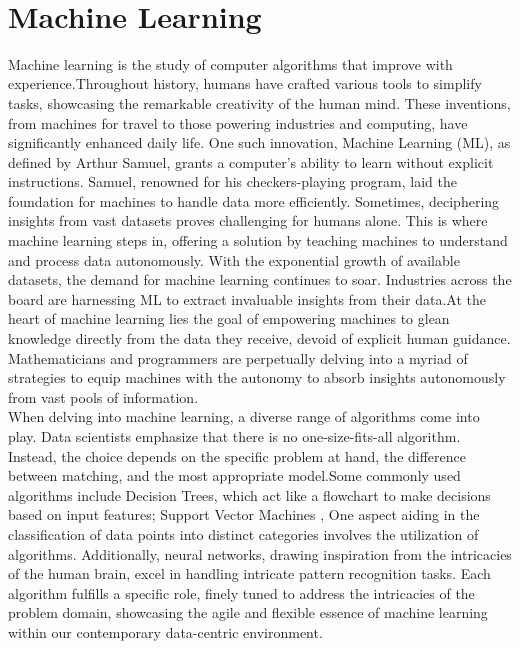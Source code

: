 \\

\section{Machine Learning }
Machine learning is the study of computer algorithms that improve with experience.Throughout history, humans have crafted various tools to simplify tasks, showcasing the remarkable creativity of the human mind. These inventions, from machines for travel to those powering industries and computing, have significantly enhanced daily life. One such innovation, Machine Learning (ML), as defined by Arthur Samuel, grants a computer's ability to learn without explicit instructions. Samuel, renowned for his checkers-playing program, laid the foundation for machines to handle data more efficiently. Sometimes, deciphering insights from vast datasets proves challenging for humans alone. This is where machine learning steps in, offering a solution by teaching machines to understand and process data autonomously. With the exponential growth of available datasets, the demand for machine learning continues to soar. Industries across the board are harnessing ML to extract invaluable insights from their data.At the heart of machine learning lies the goal of empowering machines to glean knowledge directly from the data they receive, devoid of explicit human guidance. Mathematicians and programmers are perpetually delving into a myriad of strategies to equip machines with the autonomy to absorb insights autonomously from vast pools of information. 
\\
When delving into machine learning, a diverse range of algorithms come into play. Data scientists emphasize that there is no one-size-fits-all algorithm. Instead, the choice depends on the specific problem at hand, the difference between matching, and the most appropriate model.Some commonly used algorithms include Decision Trees, which act like a flowchart to make decisions based on input features; Support Vector Machines \cite{cervantes2020comprehensive}, One aspect aiding in the classification of data points into distinct categories involves the utilization of algorithms. Additionally, neural networks, drawing inspiration from the intricacies of the human brain, excel in handling intricate pattern recognition tasks. Each algorithm fulfills a specific role, finely tuned to address the intricacies of the problem domain, showcasing the agile and flexible essence of machine learning within our contemporary data-centric environment.
